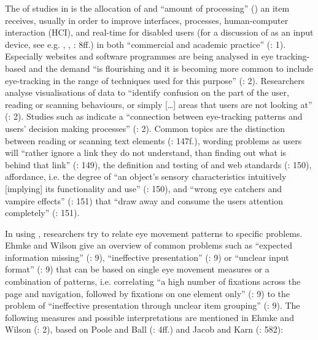 The  of  studies in  is the allocation of  and “amount of processing” (\citealt{Jacob2003}) an item receives, usually in order to improve interfaces, processes, human-computer interaction (HCI), and real-time  for disabled users (for a discussion of  as an input device, see e.g. \citealt{Jacob2003}, \citealt{Kaur2003}, \citealt{poole2005}: 8ff.) in both “commercial and academic practice” (\citealt{Ehmke2007}: 1). Especially websites and software programmes are being analysed in eye tracking-based  and the demand “is flourishing and it is becoming more common to include eye-tracking in the range of techniques used for this purpose” (\citealt{Ehmke2007}: 2). Researchers analyse visualisations of  data to “identify confusion on the part of the user, reading or scanning behaviours, or simply […] areas that users are not looking at” (\citealt{Ehmke2007}: 2). Studies such as \citet{Goldberg2002} indicate a “connection between eye-tracking patterns and users’ decision making processes” (\citealt{Ehmke2007}: 2). Common topics are the distinction between reading or scanning text elements (\citealt{manhartsberger2005}: 147f.), wording problems as users will “rather ignore a link they do not understand, than finding out what is behind that link” (\citeyear{manhartsberger2005}: 149), the definition and testing of  and web standards (\citeyear{manhartsberger2005}: 150), affordance, i.e. the degree of “an object’s sensory characteristics intuitively [implying] its functionality and use” (\citeyear{manhartsberger2005}: 150), and “wrong eye catchers and vampire effects” (\citeyear{manhartsberger2005}: 151) that “draw away and consume the users attention completely” (\citeyear{manhartsberger2005}: 151).

In using , researchers try to relate eye movement patterns to specific  problems. Ehmke and Wilson give an overview of common  problems such as “expected information missing” (\citeyear{Ehmke2007}: 9), “ineffective presentation” (\citeyear{Ehmke2007}: 9) or “unclear input format” (\citeyear{Ehmke2007}: 9) that can be based on single eye movement measures or a combination of patterns, i.e. correlating “a high number of fixations across the page and navigation, followed by fixations on one element only” (\citeyear{Ehmke2007}: 9) to the  problem of “ineffective presentation through unclear item grouping” (\citeyear{Ehmke2007}: 9). The following measures and possible interpretations are mentioned in Ehmke and Wilson (\citeyear{Ehmke2007}: 2), based on Poole and Ball (\citeyear{poole2005}: 4ff.) and Jacob and Karn (\citeyear{Jacob2003}: 582):

